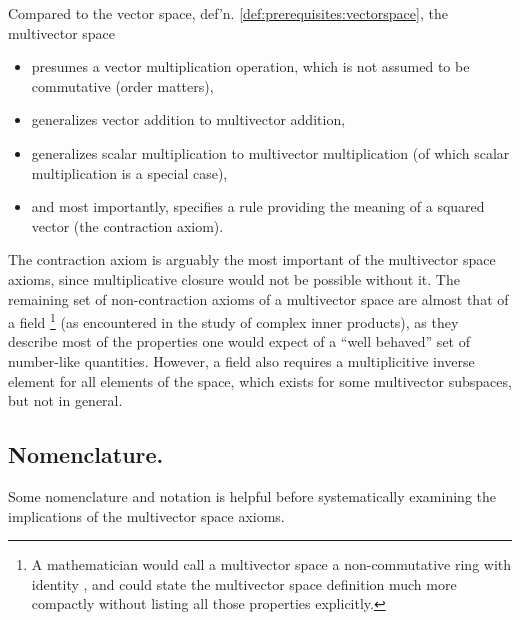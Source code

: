 Compared to the vector space, def'n. \ref{def:prerequisites:vectorspace}, the multivector space

\begin{itemize}
\item presumes a vector multiplication operation, which is not assumed to be commutative (order matters),
\item generalizes vector addition to multivector addition,
\item generalizes scalar multiplication to multivector multiplication (of which scalar multiplication is a special case),
\item and most importantly, specifies a rule providing the meaning of a squared vector (the contraction axiom).
\end{itemize}

The contraction axiom is arguably the most important of the multivector space axioms, since multiplicative closure would not be possible without it.
The remaining set of non-contraction axioms of a multivector space are almost that of a field
\footnote{A mathematician would call a multivector space a non-commutative ring with identity \citep{van1943modern}, and could state the multivector space definition much more compactly without listing all those properties explicitly.}
(as encountered in the study of complex inner products),
as they describe most of the properties one 
would expect of a ``well behaved'' set of number-like quantities.
However, a field also requires a multiplicitive inverse element for all elements of the space, which exists for some multivector subspaces, but not in general.


\subsection{Nomenclature.}

Some nomenclature and notation is helpful before systematically examining the implications of the multivector space axioms.



